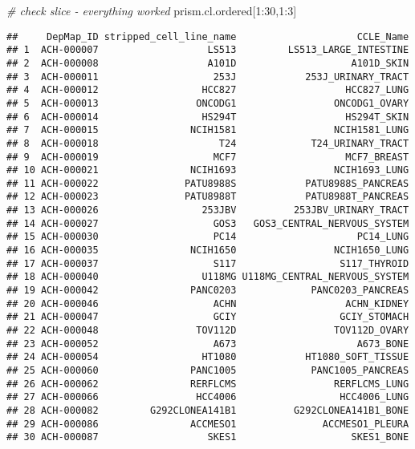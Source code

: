 \documentclass[
]{article}
\newenvironment{Shaded}{\begin{snugshade}}{\end{snugshade}}
\newcommand{\CommentTok}[1]{\textcolor[rgb]{0.56,0.35,0.01}{\textit{#1}}}
\newcommand{\DecValTok}[1]{\textcolor[rgb]{0.00,0.00,0.81}{#1}}
\newcommand{\NormalTok}[1]{#1}
\newcommand{\SpecialCharTok}[1]{\textcolor[rgb]{0.00,0.00,0.00}{#1}}
\begin{document}
\begin{Shaded}
\begin{Highlighting}[]
\CommentTok{\# check slice {-} everything worked}
\NormalTok{prism.cl.ordered[}\DecValTok{1}\SpecialCharTok{:}\DecValTok{30}\NormalTok{,}\DecValTok{1}\SpecialCharTok{:}\DecValTok{3}\NormalTok{]}
\end{Highlighting}
\end{Shaded}

\begin{verbatim}
##     DepMap_ID stripped_cell_line_name                     CCLE_Name
## 1  ACH-000007                   LS513         LS513_LARGE_INTESTINE
## 2  ACH-000008                   A101D                    A101D_SKIN
## 3  ACH-000011                    253J            253J_URINARY_TRACT
## 4  ACH-000012                  HCC827                   HCC827_LUNG
## 5  ACH-000013                 ONCODG1                 ONCODG1_OVARY
## 6  ACH-000014                  HS294T                   HS294T_SKIN
## 7  ACH-000015                NCIH1581                 NCIH1581_LUNG
## 8  ACH-000018                     T24             T24_URINARY_TRACT
## 9  ACH-000019                    MCF7                   MCF7_BREAST
## 10 ACH-000021                NCIH1693                 NCIH1693_LUNG
## 11 ACH-000022               PATU8988S            PATU8988S_PANCREAS
## 12 ACH-000023               PATU8988T            PATU8988T_PANCREAS
## 13 ACH-000026                  253JBV          253JBV_URINARY_TRACT
## 14 ACH-000027                    GOS3   GOS3_CENTRAL_NERVOUS_SYSTEM
## 15 ACH-000030                    PC14                     PC14_LUNG
## 16 ACH-000035                NCIH1650                 NCIH1650_LUNG
## 17 ACH-000037                    S117                  S117_THYROID
## 18 ACH-000040                  U118MG U118MG_CENTRAL_NERVOUS_SYSTEM
## 19 ACH-000042                PANC0203             PANC0203_PANCREAS
## 20 ACH-000046                    ACHN                   ACHN_KIDNEY
## 21 ACH-000047                    GCIY                  GCIY_STOMACH
## 22 ACH-000048                 TOV112D                 TOV112D_OVARY
## 23 ACH-000052                    A673                     A673_BONE
## 24 ACH-000054                  HT1080            HT1080_SOFT_TISSUE
## 25 ACH-000060                PANC1005             PANC1005_PANCREAS
## 26 ACH-000062                RERFLCMS                 RERFLCMS_LUNG
## 27 ACH-000066                 HCC4006                  HCC4006_LUNG
## 28 ACH-000082         G292CLONEA141B1          G292CLONEA141B1_BONE
## 29 ACH-000086                ACCMESO1               ACCMESO1_PLEURA
## 30 ACH-000087                   SKES1                    SKES1_BONE
\end{verbatim}
\end{document}
